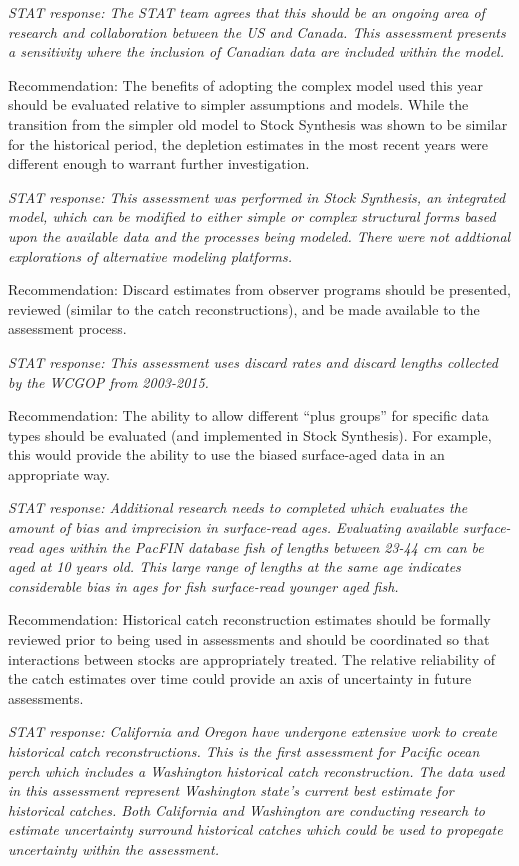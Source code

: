 \documentclass[12pt,]{article}
\begin{document}
\emph{STAT response: The STAT team agrees that this should be an ongoing
area of research and collaboration between the US and Canada. This
assessment presents a sensitivity where the inclusion of Canadian data
are included within the model.}

Recommendation: The benefits of adopting the complex model used this
year should be evaluated relative to simpler assumptions and models.
While the transition from the simpler old model to Stock Synthesis was
shown to be similar for the historical period, the depletion estimates
in the most recent years were different enough to warrant further
investigation.

\emph{STAT response: This assessment was performed in Stock Synthesis,
an integrated model, which can be modified to either simple or complex
structural forms based upon the available data and the processes being
modeled. There were not addtional explorations of alternative modeling
platforms.}

Recommendation: Discard estimates from observer programs should be
presented, reviewed (similar to the catch reconstructions), and be made
available to the assessment process.

\emph{STAT response: This assessment uses discard rates and discard
lengths collected by the WCGOP from 2003-2015.}

Recommendation: The ability to allow different ``plus groups'' for
specific data types should be evaluated (and implemented in Stock
Synthesis). For example, this would provide the ability to use the
biased surface-aged data in an appropriate way.

\emph{STAT response: Additional research needs to completed which
evaluates the amount of bias and imprecision in surface-read ages.
Evaluating available surface-read ages within the PacFIN database fish
of lengths between 23-44 cm can be aged at 10 years old. This large
range of lengths at the same age indicates considerable bias in ages for
fish surface-read younger aged fish.}

Recommendation: Historical catch reconstruction estimates should be
formally reviewed prior to being used in assessments and should be
coordinated so that interactions between stocks are appropriately
treated. The relative reliability of the catch estimates over time could
provide an axis of uncertainty in future assessments.

\emph{STAT response: California and Oregon have undergone extensive work
to create historical catch reconstructions. This is the first assessment
for Pacific ocean perch which includes a Washington historical catch
reconstruction. The data used in this assessment represent Washington
state's current best estimate for historical catches. Both California
and Washington are conducting research to estimate uncertainty surround
historical catches which could be used to propegate uncertainty within
the assessment.}
\end{document}
